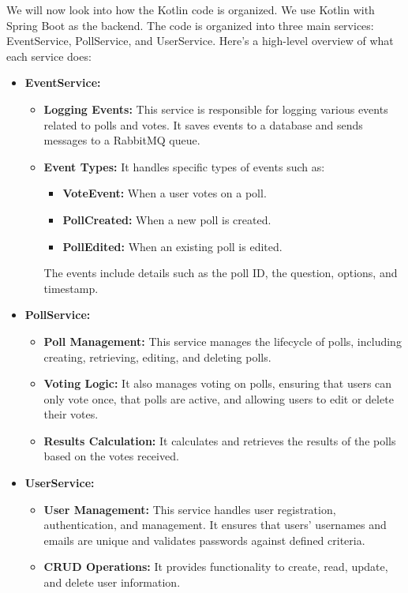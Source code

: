 We will now look into how the Kotlin code is organized. We use Kotlin with Spring Boot as the backend. The code is organized into three main services: EventService, PollService, and UserService. Here’s a high-level overview of what each service does:
\begin{itemize}
    \item \textbf{EventService:}
    \begin{itemize}
        \item \textbf{Logging Events:} This service is responsible for logging various events related to polls and votes. It saves events to a database and sends messages to a RabbitMQ queue.
        \item \textbf{Event Types:} It handles specific types of events such as:
        \begin{itemize}	
            \item \textbf{VoteEvent:} When a user votes on a poll.
            \item \textbf{PollCreated:} When a new poll is created.
            \item \textbf{PollEdited:} When an existing poll is edited.
        \end{itemize}
        The events include details such as the poll ID, the question, options, and timestamp.
    \end{itemize}

    \item \textbf{PollService:}
    \begin{itemize}
        \item \textbf{Poll Management:} This service manages the lifecycle of polls, including creating, retrieving, editing, and deleting polls.
        \item \textbf{Voting Logic:} It also manages voting on polls, ensuring that users can only vote once, that polls are active, and allowing users to edit or delete their votes.
        \item \textbf{Results Calculation:} It calculates and retrieves the results of the polls based on the votes received.
    \end{itemize}

    \item \textbf{UserService:}
    \begin{itemize}
        \item \textbf{User Management:} This service handles user registration, authentication, and management. It ensures that users' usernames and emails are unique and validates passwords against defined criteria.
        \item \textbf{CRUD Operations:} It provides functionality to create, read, update, and delete user information.
    \end{itemize}


\end{itemize}
